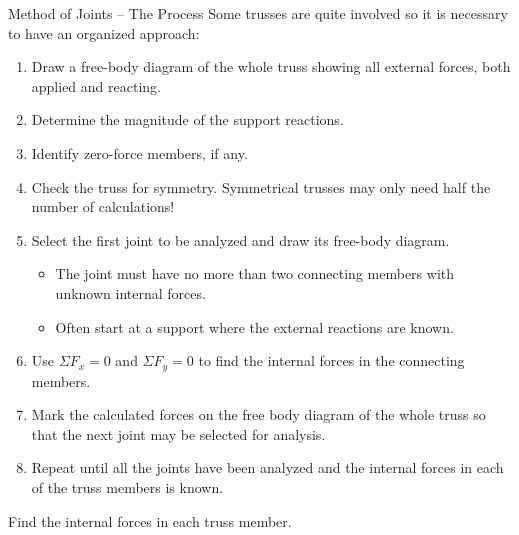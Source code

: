 \documentclass[9pt, xcolor={svgnames, x11names},professionalfonts]{beamer}
\def\scale{1}
\begin{document}
\begin{frame}{Method of Joints -- The Process}
	Some trusses are quite involved so it is necessary to have an organized approach:\pause
	\begin{enumerate}
		\item Draw a free-body diagram of the whole truss showing all external forces, both applied and reacting.\pause
		\item Determine the magnitude of the support reactions.\pause
		\item Identify zero-force members, if any.\pause
		\item Check the truss for symmetry. Symmetrical trusses may only need half the number of calculations!\pause
		\item Select the first joint to be analyzed and draw its free-body diagram.
		      \begin{itemize}
		      	\item The joint must have no more than two connecting members with unknown internal forces.
		      	\item Often start at a support where the external reactions are known.
		      \end{itemize}\pause
		\item Use $\Sigma F_x=0$ and $\Sigma F_y=0$ to find the internal forces in the connecting members.\pause
		\item Mark the calculated forces on the free body diagram of the whole truss so that the next joint may be selected
		      for analysis.\pause

		\item Repeat until all the joints have been analyzed and the internal forces in each of the truss members is
		      known.\pause
	\end{enumerate}
\end{frame}




\begin{frame}{}
	\def\scale{1}
	\begin{myexam}{}{}
		\centering
		
		\pars
		Find the internal forces in each truss member. 
	\end{myexam}
\end{frame}
\end{document}
